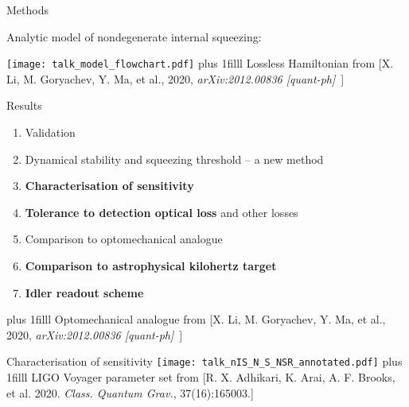 \documentclass[12pt,xcolor=dvipsnames]{beamer}
\newcommand{\vframefill}{\vskip0pt plus 1filll}
\begin{document}
\begin{frame}{Methods}
\begin{flushleft}
Analytic model of nondegenerate internal squeezing:
\end{flushleft}
\centering
\texttt{[image: talk\_model\_flowchart.pdf]}
\vframefill
{\fontsize{5.9}{10}\selectfont\vspace{-0.1cm}Lossless Hamiltonian from [X. Li, M. Goryachev, Y. Ma, et al., 2020, \emph{arXiv:2012.00836 [quant-ph]}\ ]}
\end{frame}

\begin{frame}{Results}
\vspace*{1.1cm}
\begin{enumerate}
\item Validation %
\item Dynamical stability and squeezing threshold -- a new method %
\item \textbf{Characterisation of sensitivity}
\item \textbf{Tolerance to detection optical loss} and other losses
\item Comparison to optomechanical analogue
\item \textbf{Comparison to astrophysical kilohertz target}
\item \textbf{Idler readout scheme} %
\end{enumerate}
\vframefill\centering
{\fontsize{5.9}{10}\selectfont\vspace{-0.1cm}Optomechanical analogue from [X. Li, M. Goryachev, Y. Ma, et al., 2020, \emph{arXiv:2012.00836 [quant-ph]}\ ]} 
\end{frame}

\begin{frame}{Characterisation of sensitivity} %
\centering
\vspace*{1cm}
\texttt{[image: talk\_nIS\_N\_S\_NSR\_annotated.pdf]} %
\vframefill\centering
{\tiny LIGO Voyager parameter set from [R. X. Adhikari, K. Arai, A. F. Brooks, et al. 2020. \emph{Class. Quantum Grav.}, 37(16):165003.]}
\end{frame}
\end{document}
